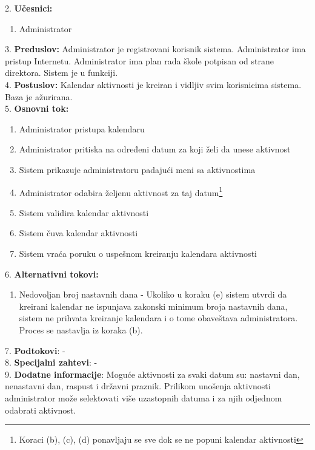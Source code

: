 \documentclass{article}
\begin{document}
2. \textbf{Učesnici:}
\begin{enumerate} [label=(\alph*)]
\item Administrator
\end{enumerate} 

3. \textbf{Preduslov:} Administrator je registrovani korisnik sistema. Administrator ima pristup Internetu. Administrator ima plan rada škole potpisan od strane direktora. Sistem je u funkciji. \\

4. \textbf{Postuslov:} Kalendar aktivnosti je kreiran i vidljiv svim korisnicima sistema. Baza je ažurirana. \\

5. \textbf{Osnovni tok:} 
\begin{enumerate} [label=(\alph*)]
\item Administrator pristupa kalendaru
\item Administrator pritiska na određeni datum za koji želi da unese aktivnost
\item Sistem prikazuje administratoru padajući meni sa aktivnostima
\item Administrator odabira željenu aktivnost za taj datum\footnote{Koraci (b), (c), (d) ponavljaju se sve dok se ne popuni kalendar aktivnosti}
\item Sistem validira kalendar aktivnosti
\item Sistem čuva kalendar aktivnosti
\item Sistem vraća poruku o uspešnom kreiranju kalendara aktivnosti
\end{enumerate}

6. \textbf{Alternativni tokovi:}
\begin{enumerate} [label=(\roman*)]
\item Nedovoljan broj nastavnih dana - Ukoliko u koraku (e) sistem utvrdi da kreirani kalendar ne ispunjava zakonski minimum broja nastavnih dana, sistem ne prihvata kreiranje kalendara i o tome obaveštava administratora. Proces se nastavlja iz koraka (b).
\end{enumerate}

7. \textbf{Podtokovi}:  - \\

8. \textbf{Specijalni zahtevi}: - \\

9. \textbf{Dodatne informacije}: Moguće aktivnosti za svaki datum su: nastavni dan, nenastavni dan, raspust i državni praznik. Prilikom unošenja aktivnosti administrator može selektovati više uzastopnih datuma i za njih odjednom odabrati aktivnost. \\
\end{document}
